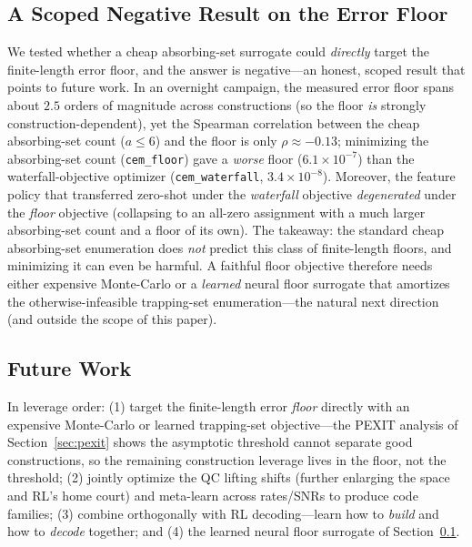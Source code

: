 \documentclass[journal]{IEEEtran}
\begin{document}
\subsection{A Scoped Negative Result on the Error Floor}
\label{sec:negative}
We tested whether a cheap absorbing-set surrogate could \emph{directly} target the
finite-length error floor, and the answer is negative---an honest, scoped result
that points to future work. In an overnight campaign, the measured error floor
spans about $2.5$ orders of magnitude across constructions (so the floor
\emph{is} strongly construction-dependent), yet the Spearman correlation between
the cheap absorbing-set count ($a\le6$) and the floor is only
$\rho\approx-0.13$; minimizing the absorbing-set count (\texttt{cem\_floor}) gave
a \emph{worse} floor ($6.1\times10^{-7}$) than the waterfall-objective optimizer
(\texttt{cem\_waterfall}, $3.4\times10^{-8}$). Moreover, the feature policy that
transferred zero-shot under the \emph{waterfall} objective \emph{degenerated}
under the \emph{floor} objective (collapsing to an all-zero assignment with a
much larger absorbing-set count and a floor of its own). The takeaway: the
standard cheap absorbing-set enumeration does \emph{not} predict this class of
finite-length floors, and minimizing it can even be harmful. A faithful
floor objective therefore needs either expensive Monte-Carlo or a \emph{learned}
neural floor surrogate that amortizes the otherwise-infeasible trapping-set
enumeration---the natural next direction (and outside the scope of this paper).

\subsection{Future Work}
In leverage order: (1) target the finite-length error \emph{floor} directly
with an expensive Monte-Carlo or learned trapping-set objective---the PEXIT
analysis of Section~\ref{sec:pexit} shows the asymptotic threshold cannot
separate good constructions, so the remaining construction leverage lives in the
floor, not the threshold; (2) jointly optimize the QC lifting shifts (further
enlarging the space and RL's home court) and meta-learn across rates/SNRs to
produce code families; (3) combine orthogonally with RL decoding---learn how to
\emph{build} and how to \emph{decode} together; and (4) the learned neural floor
surrogate of Section~\ref{sec:negative}.

\end{document}
